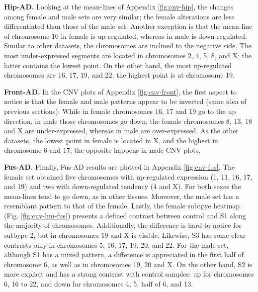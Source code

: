 \textbf{Hip-AD.} Looking at the mean-lines of Appendix \ref{fig:cnv-hip}, the changes among female and male sets are very similar; the female alterations are less differentiated than those of the male set. Another exception is that the mean-line of chromosome 10 in female is up-regulated, whereas in male is down-regulated. Similar to other datasets, the chromosomes are inclined to the negative side. The most under-expressed segments are located in chromosomes 2, 4, 5, 8, and X; the latter contains the lowest point. On the other hand, the most up-regulated chromosomes are 16, 17, 19, and 22; the highest point is at chromosome 19.

\textbf{Front-AD.} In the CNV plots of Appendix \ref{fig:cnv-front}, the first aspect to notice is that the female and male patterns appear to be inverted (same idea of previous sections). While in female chromosomes 16, 17 and 19 go to the up direction, in male those chromosomes go down; the female chromosomes 8, 13, 18 and X are under-expressed, whereas in male are over-expressed. As the other datasets, the lowest point in female is located in X, and the highest in chromosome 6 and 17; the opposite happens in male CNV plots.

\textbf{Fus-AD.} Finally, Fus-AD results are plotted in Appendix \ref{fig:cnv-fus}. The female set obtained five chromosomes with up-regulated expression (1, 11, 16, 17, and 19) and two with down-regulated tendency (4 and X). For both sexes the mean-lines tend to go down, as in other tissues. Moreover, the male set has a resemblant pattern to that of the female. Lastly, the female subtpye heatmap (Fig. \ref{fig:cnv-hm-fus}) presents a defined contrast between control and S1 along the majority of chromosomes. Additionally, the difference is hard to notice for sutbype 2, but in chromosomes 19 and X is visible. Likewise, S3 has some clear contrasts only in chromosomes 5, 16, 17, 19, 20, and 22. For the male set, although S1 has a mixed pattern, a difference is appreciated in the first half of chromosome 6, as well as in chromosomes 19, 20 and X. On the other hand, S2 is more explicit and has a strong contrast with control samples: up for chromosomes 6, 16 to 22, and down for chromosomes 4, 5, half of 6, and 13.

